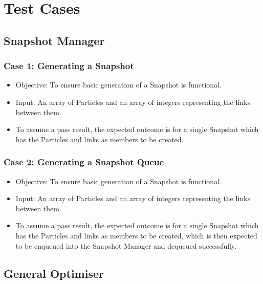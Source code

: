 \documentclass[11pt]{article}
\begin{document}
\section{Test Cases}
\subsection{Snapshot Manager}
\subsubsection{Case 1: Generating a Snapshot}
\begin{itemize}
    \item Objective: To ensure basic generation of a Snapshot is functional.
    \item Input: An array of Particles and an array of integers representing the links between them.
    \item To assume a pass result, the expected outcome is for a single Snapshot which has the Particles and links as members to be created.
\end{itemize}

\subsubsection{Case 2: Generating a Snapshot Queue}
\begin{itemize}
    \item Objective: To ensure basic generation of a Snapshot is functional.
    \item Input: An array of Particles and an array of integers representing the links between them.
    \item To assume a pass result, the expected outcome is for a single Snapshot which has the Particles and links as members to be created, which is then expected to be enqueued into the Snapshot Manager and dequeued successfully.
\end{itemize}

\subsection{General Optimiser}
\end{document}
